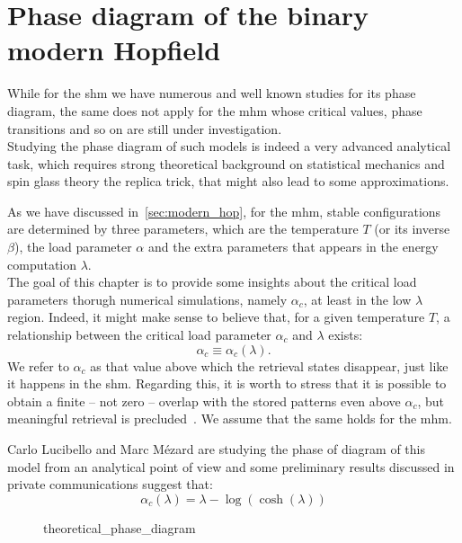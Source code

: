 \documentclass[\rootdir/main.tex]{subfiles}
\begin{document}
\chapter{Phase diagram of the binary modern Hopfield}\label{chap:phase_diagram}
While for the \acrlong{shm} we have numerous and well known studies for its phase diagram, the same does not apply for the \acrlong{mhm} whose critical values, phase transitions and so on are still under investigation.\\
Studying the phase diagram of such models is indeed a very advanced analytical task, which requires strong theoretical background on statistical mechanics and spin glass theory \eg the replica trick, that might also lead to some approximations.

As we have discussed in~\cref{sec:modern_hop}, for the \acrlong{mhm}, stable configurations are determined by three parameters, which are the temperature $T$ (or its inverse $\beta$), the load parameter $\alpha$ and the extra parameters that appears in the energy computation $\lambda$.\\
The goal of this chapter is to provide some insights about the critical load parameters thorugh numerical simulations, namely $\alpha_c$, at least in the low $\lambda$ region. Indeed, it might make sense to believe that, for a given temperature $T$, a relationship between the critical load parameter $\alpha_c$ and $\lambda$ exists:
\begin{equation}
    \alpha_c \equiv \alpha_c\left(\lambda\right).
\end{equation}
We refer to $\alpha_c$ as that value above which the retrieval states disappear, just like it happens in the \acrlong{shm}. Regarding this, it is worth to stress that it is possible to obtain a finite -- \ie not zero -- overlap with the stored patterns even above $\alpha_c$, but meaningful retrieval is precluded~\cite{amit_phase}. We assume that the same holds for the \acrlong{mhm}.

Carlo Lucibello and Marc Mézard are studying the phase of diagram of this model from an analytical point of view and some preliminary results discussed in private communications suggest that:
\begin{equation}\label{eq:preliminary_phase_diagram}
    \alpha_c\left( \lambda \right) = \lambda - \log \left( \cosh\left( \lambda \right) \right)
\end{equation}
\begin{figure}
    \centering
    {theoretical_phase_diagram}
\end{figure}
\end{document}
